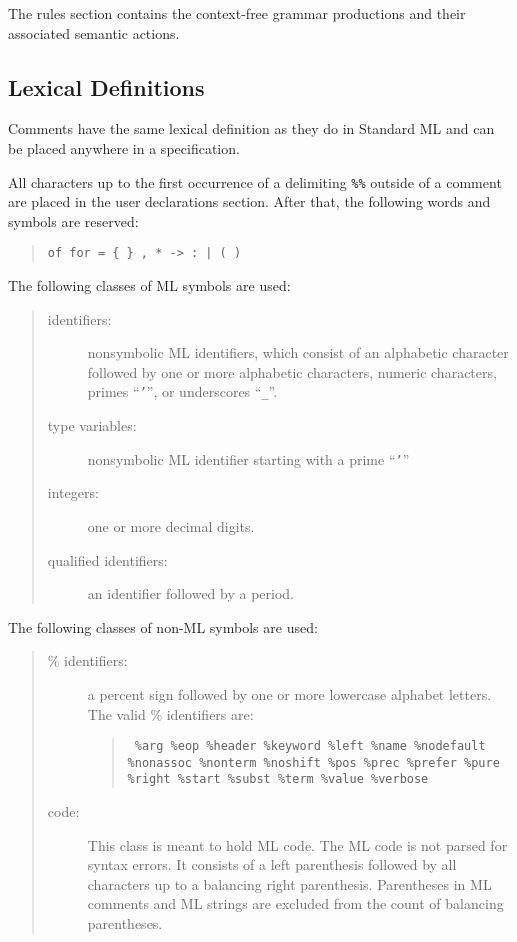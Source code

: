 \documentclass{article}
\begin{document}
The rules section contains the context-free grammar productions and their
associated semantic actions.

\subsection{Lexical Definitions}

Comments have the same lexical definition as they do in Standard
ML and can be placed anywhere in a specification.

All characters up to the first occurrence of a delimiting
{\tt  \%\%} outside of
a comment are placed in the user declarations section.  After that, the
following words and symbols are reserved:
\begin{quote}

\verb'of for = { } , * -> : | ( )'

\end{quote}
        
The following classes of ML symbols are used:
\begin{quote}
\begin{description}
\item[identifiers:]
                nonsymbolic ML identifiers, which consist
                of an alphabetic character followed by one or
                more alphabetic characters, numeric characters,
                primes ``{\tt '}'', or underscores ``{\tt \_}''.
\item[type variables:]
                nonsymbolic ML identifier starting with a prime ``{\tt '}''
\item[integers:] one or more decimal digits.
\item[qualified identifiers:] an identifier followed by a period.

\end{description}
\end{quote}
The following classes of non-ML symbols are used:
\begin{quote}
\begin{description}
\item[\% identifiers:]
                a percent sign followed by one or more lowercase
                alphabet letters.  The valid \% identifiers
                are:
\begin{quote}
\raggedright
\tt
                \%arg \%eop \%header \%keyword \%left \%name \%nodefault
                \%nonassoc \%nonterm \%noshift \%pos \%prec \%prefer
                \%pure \%right \%start \%subst \%term \%value \%verbose
\end{quote}
\item[code:]
                This class is meant to hold ML code.  The ML code is not
                parsed for syntax errors.  It consists of a left parenthesis
                followed by all characters up to a balancing right
                parenthesis.  Parentheses in ML comments and ML strings
                are excluded from the count of balancing parentheses.

\end{description}
\end{quote}
\end{document}
